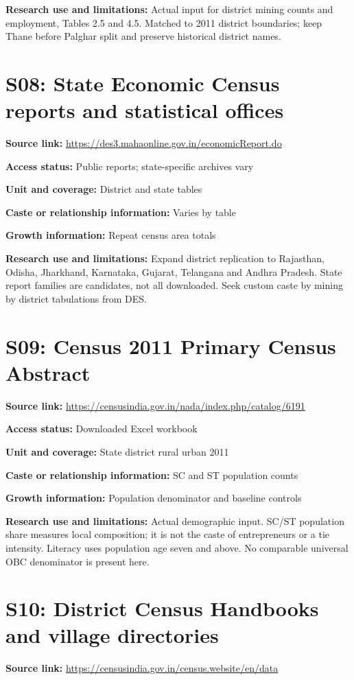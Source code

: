 \documentclass[11pt,a4paper]{report}
\begin{document}
\textbf{Research use and limitations:} Actual input for district mining counts and employment, Tables 2.5 and 4.5. Matched to 2011 district boundaries; keep Thane before Palghar split and preserve historical district names.

\section{S08: State Economic Census reports and statistical offices}\hypertarget{S08}{}
\textbf{Source link:} \url{https://des3.mahaonline.gov.in/economicReport.do}

\textbf{Access status:} Public reports; state-specific archives vary

\textbf{Unit and coverage:} District and state tables

\textbf{Caste or relationship information:} Varies by table

\textbf{Growth information:} Repeat census area totals

\textbf{Research use and limitations:} Expand district replication to Rajasthan, Odisha, Jharkhand, Karnataka, Gujarat, Telangana and Andhra Pradesh. State report families are candidates, not all downloaded. Seek custom caste by mining by district tabulations from DES.

\section{S09: Census 2011 Primary Census Abstract}\hypertarget{S09}{}
\textbf{Source link:} \url{https://censusindia.gov.in/nada/index.php/catalog/6191}

\textbf{Access status:} Downloaded Excel workbook

\textbf{Unit and coverage:} State district rural urban 2011

\textbf{Caste or relationship information:} SC and ST population counts

\textbf{Growth information:} Population denominator and baseline controls

\textbf{Research use and limitations:} Actual demographic input. SC/\allowbreak{}ST population share measures local composition; it is not the caste of entrepreneurs or a tie intensity. Literacy uses population age seven and above. No comparable universal OBC denominator is present here.

\section{S10: District Census Handbooks and village directories}\hypertarget{S10}{}
\textbf{Source link:} \url{https://censusindia.gov.in/census.website/en/data}
\end{document}
